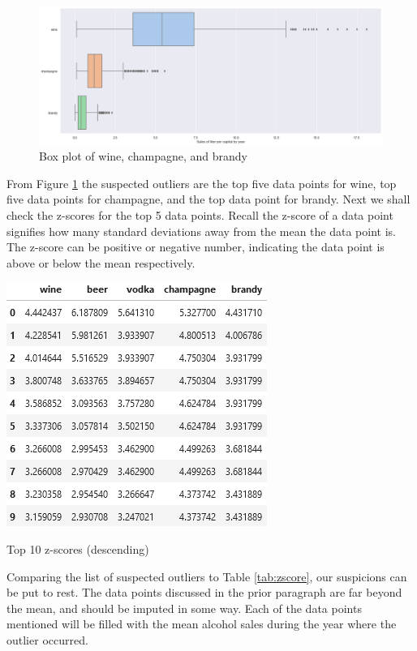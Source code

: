 \documentclass{article}
\begin{document}
\begin{figure}[!htb]
    \centering
    \includegraphics[scale = .3]{BoxploTs/output_19_1.png}
    \caption{Box plot of wine, champagne, and brandy}
    \label{fig:box_plot_2}
\end{figure}
\noindent From Figure \ref{fig:box_plot_2} the suspected outliers are the top five data points for wine, top five data points for champagne, and the top data point for brandy. Next we shall check the z-scores for the top 5 data points. Recall the z-score of a data point signifies how many standard deviations away from the mean the data point is. The z-score can be positive or negative number, indicating the data point is above or below the mean respectively.

\begin{table}[!htb]
    \centering
    \includegraphics[scale = .7]{Graphs/zscore.png}
    \caption{Top 10 z-scores (descending)}
    \label{tab:zscore}
\end{table}

\noindent Comparing the list of suspected outliers to Table \ref{tab:zscore}, our suspicions can be put to rest. The data points discussed in the prior paragraph are far beyond the mean, and should be imputed in some way. Each of the data points mentioned will be filled with the mean alcohol sales during the year where the outlier occurred. 
\end{document}

